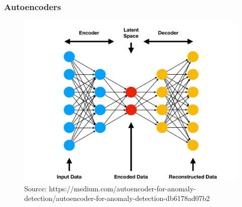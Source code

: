 \documentclass{beamer}
\theoremstyle{definition}
\begin{document}
    \begin{frame}
      \frametitle{Autoencoders}
      \begin{figure}
        \includegraphics[scale= 0.1]{Autoencoder_illustration.png}
        \captionsetup{justification=centering}
        \caption*{\tiny{Source: https://medium.com/autoencoder-for-anomaly-detection/autoencoder-for-anomaly-detection-db6178ad07b2}}
      \end{figure}

    \end{frame}
\end{document}
